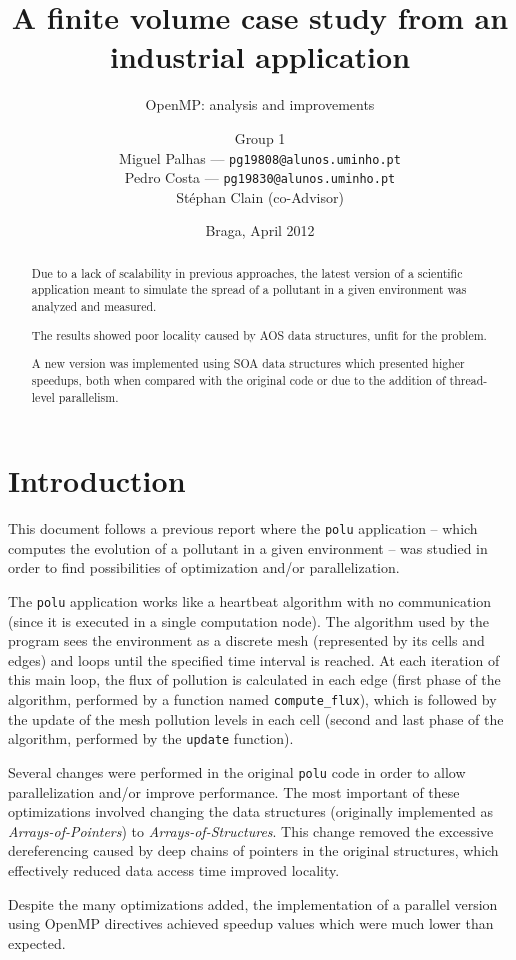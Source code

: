 \documentclass[abstract=on,9pt,twocolumn]{scrartcl}
\title{A finite volume case study from an industrial application}
\subtitle{OpenMP: analysis and improvements}
\author{{\larger Group 1}\\Miguel Palhas \hfill--- \texttt{\smaller pg19808@alunos.uminho.pt}\\Pedro Costa \hfill--- \texttt{\smaller pg19830@alunos.uminho.pt}\\\smaller Stéphan Clain (co-Advisor)\\
}
\date{Braga, April 2012}
\begin{document}
\maketitle

\begin{abstract}
Due to a lack of scalability in previous approaches, the latest version of a scientific application meant to simulate the spread of a pollutant in a given environment was analyzed and measured.

The results showed poor locality caused by AOS data structures, unfit for the problem.

A new version was implemented using SOA data structures which presented higher speedups, both when compared with the original code or due to the addition of thread-level parallelism.
\end{abstract}

\section{Introduction}
This document follows a previous report where the \texttt{polu} application -- which computes the evolution of a pollutant in a given environment -- was studied in order to find possibilities of optimization and/or parallelization.

The \texttt{polu} application works like a heartbeat algorithm with no communication (since it is executed in a single computation node). The algorithm used by the program sees the environment as a discrete mesh (represented by its cells and edges) and loops until the specified time interval is reached. At each iteration of this main loop, the flux of pollution is calculated in each edge (first phase of the algorithm, performed by a function named \texttt{compute\_flux}), which is followed by the update of the mesh pollution levels in each cell (second and last phase of the algorithm, performed by the \texttt{update} function).

Several changes were performed in the original \texttt{polu} code in order to allow parallelization and/or improve performance. The most important of these optimizations involved changing the data structures (originally implemented as \textit{Arrays-of-Pointers}) to \textit{Arrays-of-Structures}. This change removed the excessive dereferencing caused by deep chains of pointers in the original structures, which effectively reduced data access time improved locality.

Despite the many optimizations added, the implementation of a parallel version using OpenMP directives achieved speedup values which were much lower than expected.
\end{document}
